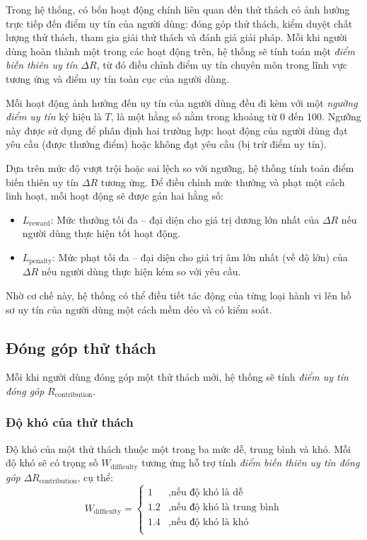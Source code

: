 Trong hệ thống, có bốn hoạt động chính liên quan đến thử thách có ảnh hưởng trực tiếp đến điểm uy tín của người dùng: đóng góp thử thách, kiểm duyệt chất lượng thử thách, tham gia giải thử thách và đánh giá giải pháp.
Mỗi khi người dùng hoàn thành một trong các hoạt động trên, hệ thống sẽ tính toán một \textit{điểm biến thiên uy tín} $\Delta R$, từ đó điều chỉnh điểm uy tín chuyên môn trong lĩnh vực tương ứng và điểm uy tín toàn cục của người dùng.

Mỗi hoạt động ảnh hưởng đến uy tín của người dùng đều đi kèm với một \textit{ngưỡng điểm uy tín} ký hiệu là $T$, là một hằng số nằm trong khoảng từ 0 đến 100.
Ngưỡng này được sử dụng để phân định hai trường hợp: hoạt động của người dùng đạt yêu cầu (được thưởng điểm) hoặc không đạt yêu cầu (bị trừ điểm uy tín).

Dựa trên mức độ vượt trội hoặc sai lệch so với ngưỡng, hệ thống tính toán điểm biến thiên uy tín $\Delta R$ tương ứng. Để điều chỉnh mức thưởng và phạt một cách linh hoạt, mỗi hoạt động sẽ được gán hai hằng số:
\begin{itemize}
  \item $L_{\text{reward}}$: Mức thưởng tối đa -- đại diện cho giá trị dương lớn nhất của $\Delta R$ nếu người dùng thực hiện tốt hoạt động.
  \item $L_{\text{penalty}}$: Mức phạt tối đa -- đại diện cho giá trị âm lớn nhất (về độ lớn) của $\Delta R$ nếu người dùng thực hiện kém so với yêu cầu.
\end{itemize}

Nhờ cơ chế này, hệ thống có thể điều tiết tác động của từng loại hành vi lên hồ sơ uy tín của người dùng một cách mềm dẻo và có kiểm soát.

\subsection{Đóng góp thử thách}

Mỗi khi người dùng đóng góp một thử thách mới, hệ thống sẽ tính \textit{điểm uy tín đóng góp} $R_{\text{contribution}}$.

\subsubsection{Độ khó của thử thách}

Độ khó của một thử thách thuộc một trong ba mức dễ, trung bình và khó. Mỗi độ khó sẽ có trọng số $W_{\text{difficulty}}$ tương ứng hỗ trợ tính \textit{điểm biến thiên uy tín đóng góp} $\Delta R_{\text{contribution}}$, cụ thể:
\[
  W_{\text{difficulty}} =
  \begin{cases}
    1   & , \text{nếu độ khó là dễ}         \\
    1.2 & , \text{nếu độ khó là trung bình} \\
    1.4 & , \text{nếu độ khó là khó}        \\
  \end{cases}
\]

